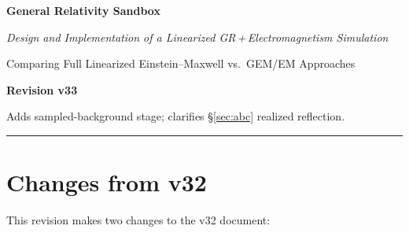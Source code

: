 \documentclass[11pt,a4paper]{article}
\begin{document}

\begin{titlepage}
  \centering
  \vspace*{3cm}
  {\Huge\bfseries\color{deepblue} General Relativity Sandbox\par}
  \vspace{0.8cm}
  {\large\itshape Design and Implementation of a Linearized GR\,+\,Electromagnetism Simulation\par}
  \vspace{0.4cm}
  {\normalsize\color{gray} Comparing Full Linearized Einstein--Maxwell vs.\ GEM/EM Approaches\par}
  \vspace{1.2cm}
  {\large\bfseries\color{midblue} Revision v33\par}
  \vspace{0.2cm}
  {\small\color{gray} Adds sampled-background stage; clarifies §\ref{sec:abc} realized reflection.\par}
  \vspace{1.5cm}
  \hrule
\end{titlepage}

\tableofcontents
\newpage

\section*{Changes from v32}

This revision makes two changes to the v32 document:
\end{document}
